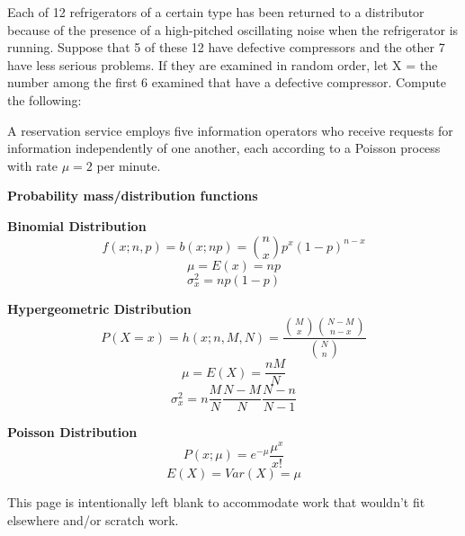 \documentclass[letterpaper,12pt,addpoints]{exam}
\begin{document}
\begin{questions}

\clearpage
\question Each of 12 refrigerators of a certain type has been returned to a distributor because of the presence of a high-pitched oscillating noise when the refrigerator is running. Suppose that 5 of these 12 have defective compressors and the other 7 have less serious problems. If they are examined in random order, let X = the number among the first 6 examined that have a defective compressor. Compute the following:

\clearpage
\question A reservation service employs five information operators who receive requests for information independently of one another, each according to a Poisson process with rate $\mu=2$ per minute.

\end{questions}
\clearpage

\centering \textbf{\large Probability mass/distribution functions}

\flushleft \textbf{Binomial Distribution}
$$f(x;n,p)=b(x;np)=\binom{n}{x}p^x(1-p)^{n-x}$$
$$\mu=E(x)=np$$
$$\sigma^2_x=np(1-p)$$

\flushleft \textbf{Hypergeometric Distribution}
$$P(X=x)=h(x;n,M,N)=\frac{\binom{M}{x}\binom{N-M}{n-x}}{\binom{N}{n}}$$
$$\mu=E(X)=\frac{nM}{N}$$
$$\sigma^2_x=n\frac{M}{N}\frac{N-M}{N}\frac{N-n}{N-1}$$

\flushleft \textbf{Poisson Distribution}
$$P(x;\mu)=e^{-\mu}\frac{\mu^x}{x!}$$
$$E(X)=Var(X)=\mu$$

\clearpage
This page is intentionally left blank to accommodate work that wouldn't fit elsewhere and/or scratch work.
\end{document}
